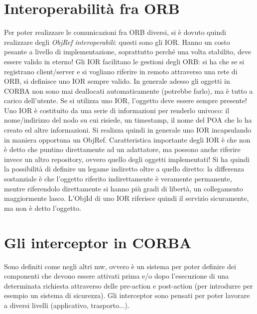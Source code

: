 \section{Interoperabilità fra ORB}
Per poter realizzare le comunicazioni fra ORB diversi, si è dovuto quindi realizzare degli \textit{ObjRef
interoperabili}: questi sono gli IOR. Hanno un costo pesante a livello di implementazione, soprattutto perché una volta
stabilito, deve essere valido in eterno!
Gli IOR facilitano le gestioni degli ORB: si ha che se si registrano client/server e si vogliano riferire in remoto
attraverso una rete di ORB, si definisce uno IOR sempre valido. In generale adesso gli oggetti in CORBA non sono mai
deallocati automaticamente (potrebbe farlo), ma è tutto a carico dell'utente. Se si utilizza uno IOR, l'oggetto deve
essere sempre presente!
Uno IOR è costituito da una serie di informazioni per renderlo univoco: il nome/indirizzo del nodo su cui risiede, un
timestamp, il nome del POA che lo ha creato ed altre informazioni. Si realizza quindi in generale uno IOR incapsulando
in maniera opportuna un ObjRef.
Caratteristica importante degli IOR è che non è detto che puntino direttamente ad un adattatore, ma possono anche
riferire invece un altro repository, ovvero quello degli oggetti implementati! Si ha quindi la possibilità di
definire un legame indiretto oltre a quello diretto: la differenza sostanziale è che l'oggetto riferito indirettamente è
veramente permanente, mentre riferendolo direttamente si hanno più gradi di libertà, un collegamento maggiormente
lasco. L'ObjId di uno IOR riferisce quindi il servizio sicuramente, ma non è detto l'oggetto.
\section{Gli interceptor in CORBA}
Sono definiti come negli altri mw, ovvero è un sistema per poter definire dei componenti che devono essere attivati
prima e/o dopo l'esecuzione di una determinata richiesta attraverso delle pre-action e post-action (per introdurre per esempio un sistema di sicurezza). Gli
interceptor sono pensati per poter lavorare a diversi livelli (applicativo, trasporto...).
